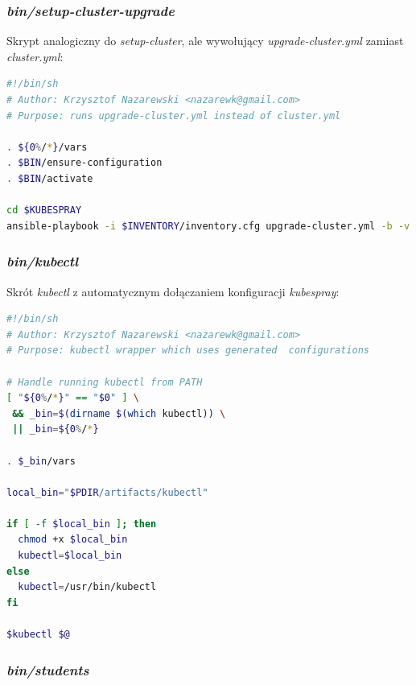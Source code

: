 \documentclass[a4paper,12pt,twoside,openany]{report}
\begin{document}
\newpage

\hypertarget{binsetup-cluster-upgrade}{%
\subsubsection{\texorpdfstring{\emph{bin/setup-cluster-upgrade}}{bin/setup-cluster-upgrade}}\label{binsetup-cluster-upgrade}}

Skrypt analogiczny do \emph{setup-cluster}, ale wywołujący
\emph{upgrade-cluster.yml} zamiast \emph{cluster.yml}:

\begin{lstlisting}[language=bash]
#!/bin/sh
# Author: Krzysztof Nazarewski <nazarewk@gmail.com>
# Purpose: runs upgrade-cluster.yml instead of cluster.yml

. ${0%/*}/vars
. $BIN/ensure-configuration
. $BIN/activate

cd $KUBESPRAY
ansible-playbook -i $INVENTORY/inventory.cfg upgrade-cluster.yml -b -v $@
\end{lstlisting}

\hypertarget{binkubectl}{%
\subsubsection{\texorpdfstring{\emph{bin/kubectl}}{bin/kubectl}}\label{binkubectl}}

Skrót \emph{kubectl} z automatycznym dołączaniem konfiguracji
\emph{kubespray}:

\begin{lstlisting}[language=bash]
#!/bin/sh
# Author: Krzysztof Nazarewski <nazarewk@gmail.com>
# Purpose: kubectl wrapper which uses generated  configurations

# Handle running kubectl from PATH
[ "${0%/*}" == "$0" ] \
 && _bin=$(dirname $(which kubectl)) \
 || _bin=${0%/*}

. $_bin/vars

local_bin="$PDIR/artifacts/kubectl"

if [ -f $local_bin ]; then
  chmod +x $local_bin
  kubectl=$local_bin
else
  kubectl=/usr/bin/kubectl
fi

$kubectl $@
\end{lstlisting}

\newpage

\hypertarget{binstudents}{%
\subsubsection{\texorpdfstring{\emph{bin/students}}{bin/students}}\label{binstudents}}
\end{document}
